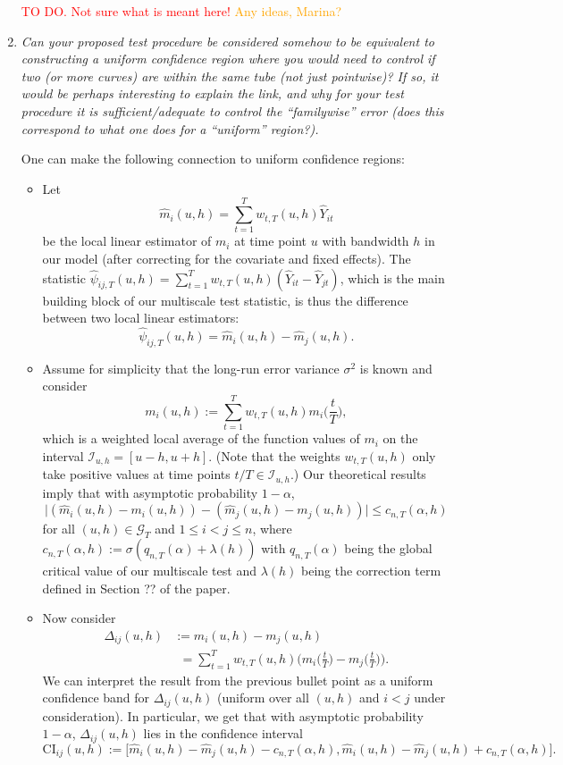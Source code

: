\documentclass[a4paper,12pt]{article}
\begin{document}
\begin{enumerate}[label=\arabic*.,leftmargin=0.6cm]
\textcolor{red}{TO DO. Not sure what is meant here!} \textcolor{orange}{Any ideas, Marina?}


\item \textit{Can your proposed test procedure be considered somehow to be equivalent to constructing a uniform confidence region where you would need to control if two (or more curves) are within the same tube (not just pointwise)? If so, it would be perhaps interesting to explain the link, and why for your test procedure it is sufficient/adequate to control the ``familywise'' error (does this correspond to what one does for a ``uniform'' region?).}

One can make the following connection to uniform confidence regions: 
\begin{itemize}[leftmargin=0.45cm,itemsep=0pt,topsep=0pt]

\item Let 
\[ \widehat{m}_i(u,h) = \sum_{t=1}^T w_{t,T}(u,h) \widehat{Y}_{it} \]
be the local linear estimator of $m_i$ at time point $u$ with bandwidth $h$ in our model (after correcting for the covariate and fixed effects). The statistic $\widehat{\psi}_{ij,T}(u,h) = \sum_{t=1}^T w_{t,T}(u,h) (\widehat{Y}_{it} - \widehat{Y}_{jt})$, which is the main building block of our multiscale test statistic, is thus the difference between two local linear estimators: 
\[ \widehat{\psi}_{ij,T}(u,h) = \widehat{m}_i(u,h) - \widehat{m}_j(u,h). \]

\item Assume for simplicity that the long-run error variance $\sigma^2$ is known and consider
\[ m_i(u,h) :=  \sum_{t=1}^T w_{t,T}(u,h) m_i\Big(\frac{t}{T}\Big), \]
which is a weighted local average of the function values of $m_i$ on the interval $\mathcal{I}_{u,h} = [u-h,u+h]$. (Note that the weights $w_{t,T}(u,h)$ only take positive values at time points $t/T \in \mathcal{I}_{u,h}$.) Our theoretical results imply that with asymptotic probability $1-\alpha$, 
\[ \Big| (\widehat{m}_{i}(u,h) - m_i(u,h)) - (\widehat{m}_{j}(u,h) - m_j(u,h)) \Big| \le c_{n,T}(\alpha,h) \]
for all $(u,h) \in \mathcal{G}_T$ and $1 \le i < j \le n$, where $c_{n,T}(\alpha,h) := \sigma(q_{n,T}(\alpha) + \lambda(h))$ with $q_{n,T}(\alpha)$ being the global critical value of our multiscale test and $\lambda(h)$ being the correction term defined in Section ?? of the paper. 

\item Now consider 
\begin{align*}
\Delta_{ij}(u,h) & := m_i(u,h) - m_j(u,h) \\ & \phantom{:}= \sum_{t=1}^T w_{t,T}(u,h) \Big(m_i\Big(\frac{t}{T}\Big) - m_j\Big(\frac{t}{T}\Big)\Big). 
\end{align*}
We can interpret the result from the previous bullet point as a uniform confidence band for $\Delta_{ij}(u,h)$ (uniform over all $(u,h)$ and $i < j$ under consideration). In particular, we get that with asymptotic probability $1-\alpha$, $\Delta_{ij}(u,h)$ lies in the confidence interval
\[ \text{CI}_{ij}(u,h) := \Big[ \widehat{m}_{i}(u,h) - \widehat{m}_{j}(u,h) - c_{n,T}(\alpha,h), \widehat{m}_{i}(u,h) - \widehat{m}_{j}(u,h) + c_{n,T}(\alpha,h) \Big]. \]


\end{itemize}
\end{enumerate}
\end{document}
